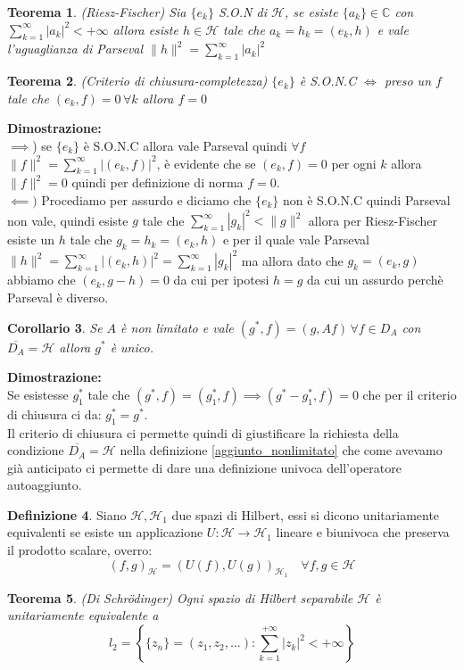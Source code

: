 \documentclass[12pt]{book}
\theoremstyle{plain}
\newcommand{\C}{\mathbb{C}}
\renewcommand{\H}{\mathcal{H}}
\newtheorem{thm}{Teorema}[section]
\newtheorem{coro}[thm]{Corollario}
\theoremstyle{definition}
\newtheorem{dfn}[thm]{Definizione}
\theoremstyle{remark}
\begin{document}
\begin{thm}
(Riesz-Fischer) Sia $\{e_k\}$ S.O.N di $\H$, se esiste $\{a_k\}\in\C$ con $\sum_{k=1}^\infty|a_k|^2<+\infty$ allora esiste $h\in\H$ tale che $a_k=h_k=(e_k,h)$ e vale l'uguaglianza di Parseval $\|h\|^2 = \sum_{k=1}^\infty|a_k|^2$
\end{thm}
\begin{thm}
(Criterio di chiusura-completezza) $\{e_k\}$ è S.O.N.C $\iff$ preso un $f$ tale che $(e_k,f)=0\,\forall k$ allora $f=0$
\end{thm}
\hspace{-1.6em}\textbf{Dimostrazione:}\\
$\implies$) se $\{e_k\}$ è S.O.N.C allora vale Parseval quindi $\forall f$ $\|f\|^2 = \sum_{k=1}^\infty|(e_k,f)|^2$, è evidente che se $(e_k,f)=0$ per ogni $k$ allora $\|f\|^2=0$ quindi per definizione di norma $f=0$.\\
$\impliedby)$ Procediamo per assurdo e diciamo che $\{e_k\}$ non è S.O.N.C quindi Parseval non vale, quindi esiste $g$ tale che $\sum_{k=1}^\infty|g_k|^2<\|g\|^2$ allora per Riesz-Fischer esiste un $h$ tale che $g_k=h_k=(e_k,h)$ e per il quale vale Parseval $\|h\|^2 = \sum_{k=1}^\infty|(e_k,h)|^2 = \sum_{k=1}^\infty|g_k|^2$ ma allora dato che $g_k=(e_k,g)$ abbiamo che $(e_k,g-h)=0$ da cui per ipotesi $h=g$ da cui un assurdo perchè Parseval è diverso.
\begin{coro}
Se $A$ è non limitato e vale $(g^*,f)=(g,Af)\, \forall f\in D_A$ con $\overline{D_A}=\H$ allora $g^*$ è unico.
\end{coro}
\hspace{-1.6em}\textbf{Dimostrazione:}\\
Se esistesse $g_1^*$ tale che $(g^*,f) = (g_1^*,f)\implies (g^*-g_1^*,f)=0$ che per il criterio di chiusura ci da: $g^*_1=g^*$.\\
\newline
Il criterio di chiusura ci permette quindi di giustificare la richiesta della condizione $\overline{D_A}=\H$ nella definizione \eqref{aggiunto_nonlimitato}  che come avevamo già anticipato ci permette di dare una definizione univoca dell'operatore autoaggiunto.
\begin{dfn}
Siano $\H,\H_1$ due spazi di Hilbert, essi si dicono unitariamente equivalenti se esiste un applicazione $U:\H\to\H_1$ lineare e biunivoca che preserva il prodotto scalare, overro:
\[(f,g)_\H = (U(f),U(g))_{\H_1}\quad \forall f,g\in\H\]
\end{dfn}
\begin{thm}
(Di Schr{\"o}dinger) Ogni spazio di Hilbert separabile $\H$ è unitariamente equivalente a \[l_2 = \left\{\{z_n\}=(z_1,z_2,\dots) : \sum_{k=1}^{+\infty}|z_k|^2<+\infty\right\}\]
\end{thm}
\end{document}
